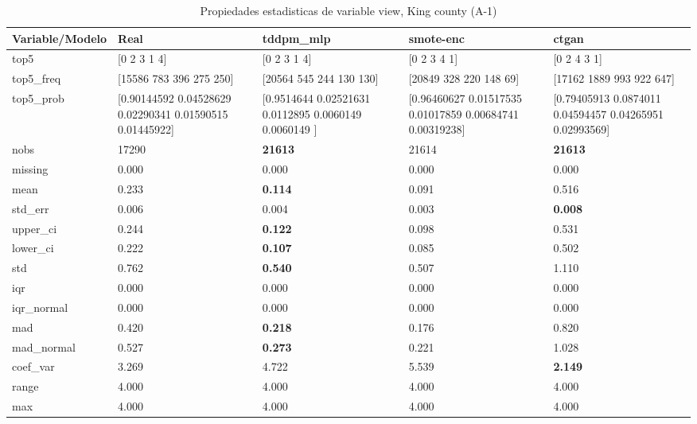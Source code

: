 \begin{table}[H]
\centering
\fontsize{8}{14}\selectfont
\caption{Propiedades  estadisticas de variable view, King county (A-1)}
\label{table-stats-king county-a-1-view}
\begin{tabular}{|l|m{10em}|m{10em}|m{10em}|m{10em}|}
\hline
 \rowcolor[gray]{0.8}
Variable/Modelo & Real & tddpm\_mlp & smote-enc & ctgan \\
\hline top5 & [0 2 3 1 4] & [0 2 3 1 4] & [0 2 3 4 1] & [0 2 4 3 1] \\
\hline top5\_freq & [15586   783   396   275   250] & [20564   545   244   130   130] & [20849   328   220   148    69] & [17162  1889   993   922   647] \\
\hline top5\_prob & [0.90144592 0.04528629 0.02290341 0.01590515 0.01445922] & [0.9514644  0.02521631 0.0112895  0.0060149  0.0060149 ] & [0.96460627 0.01517535 0.01017859 0.00684741 0.00319238] & [0.79405913 0.0874011  0.04594457 0.04265951 0.02993569] \\
\hline nobs & 17290 & \bfseries 21613 & \cellcolor[rgb]{0.9, 0.54, 0.52} 21614 & \bfseries 21613 \\
\hline missing & 0.000 & 0.000 & 0.000 & 0.000 \\
\hline mean & 0.233 & \bfseries 0.114 & 0.091 & \cellcolor[rgb]{0.9, 0.54, 0.52} 0.516 \\
\hline std\_err & 0.006 & 0.004 & \cellcolor[rgb]{0.9, 0.54, 0.52} 0.003 & \bfseries 0.008 \\
\hline upper\_ci & 0.244 & \bfseries 0.122 & 0.098 & \cellcolor[rgb]{0.9, 0.54, 0.52} 0.531 \\
\hline lower\_ci & 0.222 & \bfseries 0.107 & 0.085 & \cellcolor[rgb]{0.9, 0.54, 0.52} 0.502 \\
\hline std & 0.762 & \bfseries 0.540 & 0.507 & \cellcolor[rgb]{0.9, 0.54, 0.52} 1.110 \\
\hline iqr & 0.000 & 0.000 & 0.000 & 0.000 \\
\hline iqr\_normal & 0.000 & 0.000 & 0.000 & 0.000 \\
\hline mad & 0.420 & \bfseries 0.218 & 0.176 & \cellcolor[rgb]{0.9, 0.54, 0.52} 0.820 \\
\hline mad\_normal & 0.527 & \bfseries 0.273 & 0.221 & \cellcolor[rgb]{0.9, 0.54, 0.52} 1.028 \\
\hline coef\_var & 3.269 & 4.722 & \cellcolor[rgb]{0.9, 0.54, 0.52} 5.539 & \bfseries 2.149 \\
\hline range & 4.000 & 4.000 & 4.000 & 4.000 \\
\hline max & 4.000 & 4.000 & 4.000 & 4.000 \\

\end{tabular}
\end{table}
